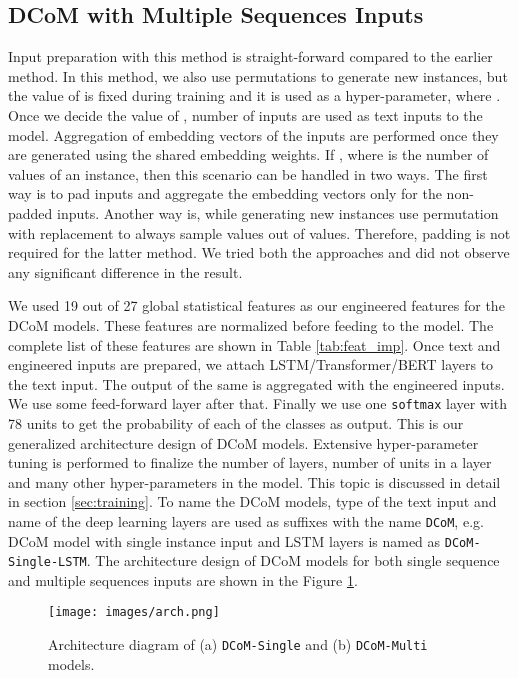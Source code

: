\documentclass{article}
\begin{document}
\subsection{DCoM with Multiple Sequences Inputs}
Input preparation with this method is straight-forward compared to the earlier method. In this method, we also use permutations to generate new instances, but the value of  is fixed during training and it is used as a hyper-parameter, where . Once we decide the value of ,  number of inputs are used as text inputs to the model. Aggregation of embedding vectors of the inputs are performed once they are generated using the shared embedding weights. If , where  is the number of values of an instance, then this scenario can be handled in two ways. The first way is to pad  inputs and aggregate the embedding vectors only for the non-padded inputs. Another way is, while generating new instances use permutation with replacement to always sample  values out of  values. Therefore, padding is not required for the latter method. We tried both the approaches and did not observe any significant difference in the result.

We used 19 out of 27 global statistical features \cite{Hulsebos} as our engineered features for the DCoM models. These features are normalized before feeding to the model. The complete list of these features are shown in Table \ref{tab:feat_imp}. Once text and engineered inputs are prepared, we attach LSTM/Transformer/BERT layers to the text input. The output of the same is aggregated with the engineered inputs. We use some feed-forward layer after that. Finally we use one \texttt{softmax} layer with 78 units to get the probability of each of the classes as output. This is our generalized architecture design of DCoM models. Extensive hyper-parameter tuning is performed to finalize the number of layers, number of units in a layer and many other hyper-parameters in the model. This topic is discussed in detail in section \ref{sec:training}. To name the DCoM models, type of the text input and name of the deep learning layers are used as suffixes with the name \texttt{DCoM}, e.g. DCoM model with single instance input and LSTM layers is named as \texttt{DCoM-Single-LSTM}. The architecture design of DCoM models for both single sequence and multiple sequences inputs are shown in the Figure \ref{fig:arch}.

\begin{figure}[ht]
	\centering
	\texttt{[image: images/arch.png]}
	\caption{Architecture diagram of (a) \texttt{DCoM-Single} and (b) \texttt{DCoM-Multi} models.}
	\label{fig:arch}
\end{figure}
\end{document}

